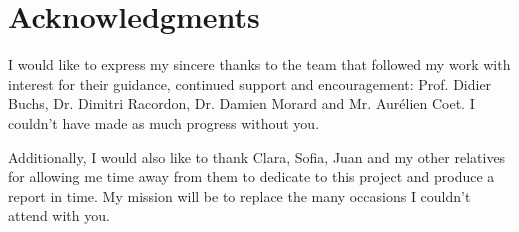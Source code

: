 \documentclass[11pt]{article}
\begin{document}
%
%
%	
%	
%	
%	


%
%

\newpage
\section*{Acknowledgments}

I would like to express my sincere thanks to the team that followed my work with interest for their guidance, continued support and encouragement: Prof. Didier Buchs, Dr. Dimitri Racordon, Dr. Damien Morard and Mr. Aurélien Coet. I couldn't have made as much progress without you.

Additionally, I would also like to thank Clara, Sofia, Juan and my other relatives for allowing me time away from them to dedicate to this project and produce a report in time. My mission will be to replace the many occasions I couldn't attend with you.
\end{document}
